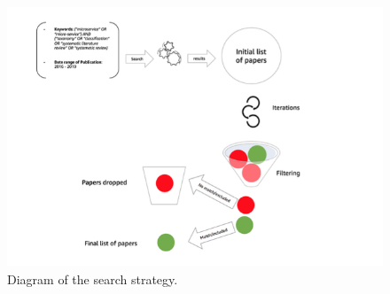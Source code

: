 \documentclass{article}
\begin{document}
\begin{figure}[h!]
\includegraphics{searchstrategy.png}
\caption{Diagram of the search strategy.}
\end{figure}
\end{document}
